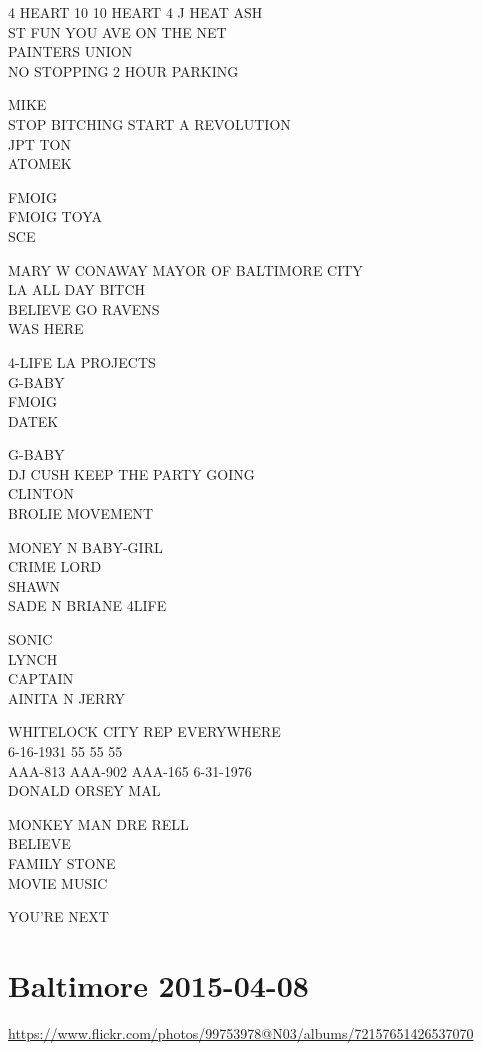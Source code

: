 \documentclass[10pt,letterpaper]{article}
\begin{document}
4 HEART 10 10 HEART 4 J HEAT ASH\\
ST FUN YOU AVE ON THE NET\\
PAINTERS UNION\\
NO STOPPING 2 HOUR PARKING

MIKE\\
STOP BITCHING START A REVOLUTION\\
JPT TON\\
ATOMEK

FMOIG\\
FMOIG TOYA\\
SCE

MARY W CONAWAY MAYOR OF BALTIMORE CITY\\
LA ALL DAY BITCH\\
BELIEVE GO RAVENS\\
WAS HERE

4{-}LIFE LA PROJECTS\\
G{-}BABY\\
FMOIG\\
DATEK

G{-}BABY\\
DJ CUSH KEEP THE PARTY GOING\\
CLINTON\\
BROLIE MOVEMENT

MONEY N BABY{-}GIRL\\
CRIME LORD\\
SHAWN\\
SADE N BRIANE 4LIFE

SONIC\\
LYNCH\\
CAPTAIN\\
AINITA N JERRY

WHITELOCK CITY REP EVERYWHERE\\
6{-}16{-}1931 55 55 55\\
AAA{-}813 AAA{-}902 AAA{-}165 6{-}31{-}1976\\
DONALD ORSEY MAL

MONKEY MAN DRE RELL\\
BELIEVE\\
FAMILY STONE\\
MOVIE MUSIC

YOU'RE NEXT
\pagebreak

\section*{Baltimore 2015-04-08}

\url{https://www.flickr.com/photos/99753978@N03/albums/72157651426537070}
\end{document}
